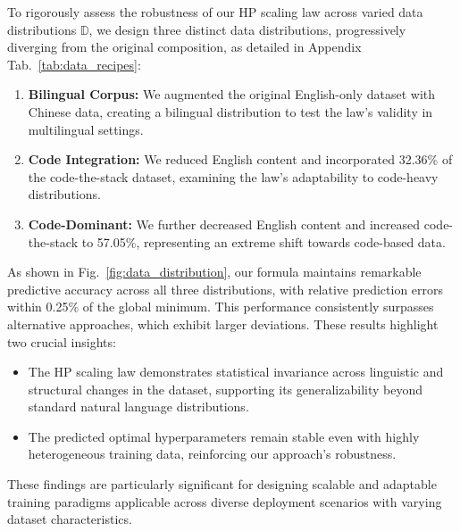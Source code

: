 \documentclass[11pt]{article}
\begin{document}
    To rigorously assess the robustness of our HP scaling law across varied data distributions $\mathbb{D}$, we design three distinct data distributions, progressively diverging from the original composition, as detailed in Appendix Tab.~\ref{tab:data_recipes}:
    \begin{enumerate}
    \item \textbf{Bilingual Corpus:} We augmented the original English-only dataset with Chinese data, creating a bilingual distribution to test the law's validity in multilingual settings.
    \item \textbf{Code Integration:} We reduced English content and incorporated 32.36\% of the code-the-stack dataset, examining the law's adaptability to code-heavy distributions.
    \item \textbf{Code-Dominant:} We further decreased English content and increased code-the-stack to 57.05\%, representing an extreme shift towards code-based data.
    \end{enumerate}
    
    As shown in Fig.~\ref{fig:data_distribution}, our formula maintains remarkable predictive accuracy across all three distributions, with relative prediction errors within 0.25\% of the global minimum. This performance consistently surpasses alternative approaches, which exhibit larger deviations. These results highlight two crucial insights:

    \begin{itemize}
    \item The HP scaling law demonstrates statistical invariance across linguistic and structural changes in the dataset, supporting its generalizability beyond standard natural language distributions.
    
    \item The predicted optimal hyperparameters remain stable even with highly heterogeneous training data, reinforcing our approach's robustness.
    \end{itemize}

    These findings are particularly significant for designing scalable and adaptable training paradigms applicable across diverse deployment scenarios with varying dataset characteristics.
\end{document}

